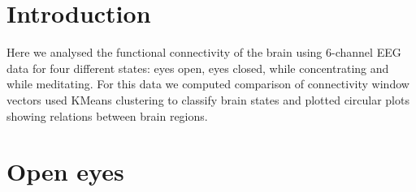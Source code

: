\section{Introduction}
Here we analysed the functional connectivity of the brain using 6-channel EEG data for four different states: eyes open, eyes closed, while concentrating and while meditating. For this data we computed 
comparison of connectivity window vectors used KMeans clustering to classify brain states and plotted circular plots showing relations between brain regions.









\section{Open eyes}



